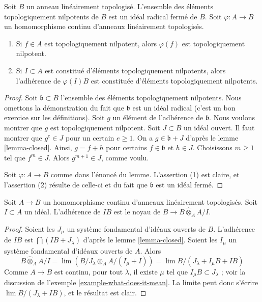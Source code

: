 \begin{lemma}
\label{lemma-topologically-nilpotent}
Soit $B$ un anneau linéairement topologisé. L'ensemble des éléments topologiquement nilpotents
de $B$ est un idéal radical fermé de $B$.
Soit $\varphi : A \to B$ un homomorphisme continu d'anneaux linéairement topologisés.
\begin{enumerate}
\item Si $f \in A$ est topologiquement nilpotent, alors $\varphi(f)$ est
topologiquement nilpotent.
\item Si $I \subset A$ est constitué d'éléments topologiquement nilpotents,
alors l'adhérence de $\varphi(I)B$ est constituée d'éléments topologiquement
nilpotents.
\end{enumerate}
\end{lemma}

\begin{proof}
Soit $\mathfrak b \subset B$ l'ensemble des éléments topologiquement nilpotents.
Nous omettons la démonstration du fait que $\mathfrak b$ est un idéal radical
(c'est un bon exercice sur les définitions). Soit $g$ un élément de l'adhérence
de $\mathfrak b$. Nous voulons montrer que $g$ est topologiquement nilpotent.
Soit $J \subset B$ un idéal ouvert. Il faut montrer que
$g^e \in J$ pour un certain $e \geq 1$. On a $g \in \mathfrak b + J$
d'après le lemme \ref{lemma-closed}. Ainsi, $g = f + h$
pour certains $f \in \mathfrak b$ et $h \in J$. Choisissons $m \geq 1$ tel que
$f^m \in J$. Alors $g^{m + 1} \in J$, comme voulu.

\medskip\noindent
Soit $\varphi : A \to B$ comme dans l'énoncé du lemme.
L'assertion (1) est claire, et l'assertion (2) résulte de celle-ci et
du fait que $\mathfrak b$ est un idéal fermé.
\end{proof}

\begin{lemma}
\label{lemma-closure-image-ideal}
Soit $A \to B$ un homomorphisme continu d'anneaux linéairement topologisés.
Soit $I \subset A$ un idéal. L'adhérence de $IB$
est le noyau de $B \to B \widehat{\otimes}_A A/I$.
\end{lemma}

\begin{proof}
Soient les $J_\mu$ un système fondamental d'idéaux ouverts de $B$.
L'adhérence de $IB$ est $\bigcap (IB + J_\lambda)$ d'après le lemme \ref{lemma-closed}.
Soient les $I_\mu$ un système fondamental d'idéaux ouverts de $A$.
Alors
$$
B \widehat{\otimes}_A A/I = \lim (B/J_\lambda \otimes_A A/(I_\mu + I)) =
\lim B/(J_\lambda + I_\mu B + I B)
$$
Comme $A \to B$ est continu, pour tout $\lambda$, il
existe $\mu$ tel que $I_\mu B \subset J_\lambda$ ; voir la discussion
de l'exemple \ref{example-what-does-it-mean}. La limite peut donc
s'écrire $\lim B/(J_\lambda + IB)$, et le résultat est clair.
\end{proof}


